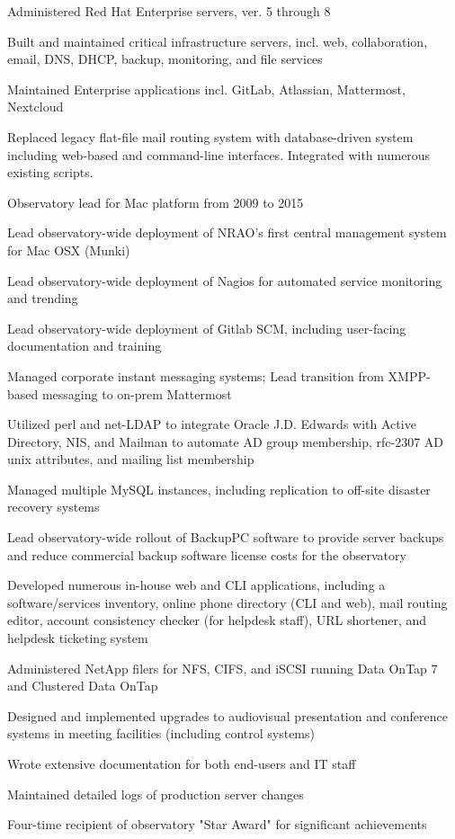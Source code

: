 \documentclass[letterpaper]{deedy-resume-openfont}
\begin{document}
\begin{minipage}[t]{0.69\textwidth}
\begin{tightemize}
	\item Administered Red Hat Enterprise servers, ver. 5 through 8
	\item Built and maintained critical infrastructure servers, incl. web, collaboration, email, DNS, DHCP, backup, monitoring, and file services
	\item Maintained Enterprise applications incl. GitLab, Atlassian, Mattermost, Nextcloud
	\item Replaced legacy flat-file mail routing system with database-driven system including web-based and command-line interfaces. Integrated with numerous existing scripts.
	\item Observatory lead for Mac platform from 2009 to 2015
	\item Lead observatory-wide deployment of NRAO's first central management system for Mac OSX (Munki)
	\item Lead observatory-wide deployment of Nagios for automated service monitoring and trending
	\item Lead observatory-wide deployment of Gitlab SCM, including user-facing	documentation and training
	\item Managed corporate instant messaging systems; Lead transition from XMPP-based messaging to on-prem Mattermost
	\item Utilized perl and net-LDAP to integrate Oracle J.D. Edwards with Active Directory, NIS, and Mailman to automate AD group membership, rfc-2307 AD unix attributes, and mailing list membership
	\item Managed multiple MySQL instances, including replication to off-site disaster recovery systems
	\item Lead observatory-wide rollout of BackupPC software to provide  server backups and reduce commercial backup software license costs for the observatory
	\item Developed numerous in-house web and CLI applications, including a software/services inventory, online phone directory (CLI and web), mail routing editor, account consistency checker (for helpdesk staff), URL shortener, and helpdesk ticketing system
	\item Administered NetApp filers for NFS, CIFS, and iSCSI running Data OnTap 7 and Clustered Data OnTap
	\item Designed and implemented upgrades to audiovisual presentation and conference systems in meeting facilities (including control systems)
	\item Wrote extensive documentation for both end-users and IT staff
	\item Maintained detailed logs of production server changes
	\item Four-time recipient of observatory "Star Award" for significant achievements
\end{tightemize}

\end{minipage}
\newpage
\end{document}
